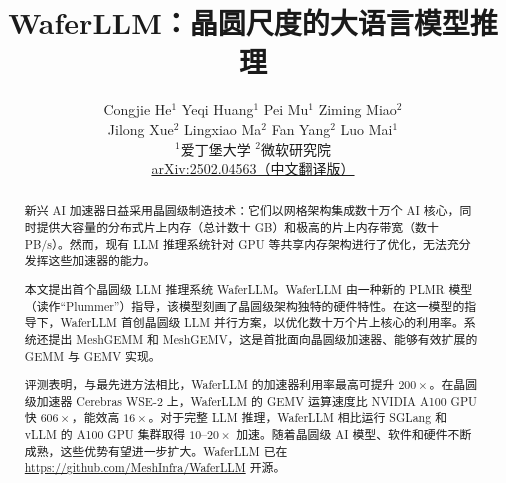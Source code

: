 \documentclass[letterpaper,twocolumn,10pt]{article}
\title{WaferLLM：晶圆尺度的大语言模型推理}
\date{}
\author{%
Congjie He$^1$ \quad Yeqi Huang$^1$ \quad Pei Mu$^1$ \quad Ziming Miao$^2$ \\
Jilong Xue$^2$ \quad Lingxiao Ma$^2$ \quad Fan Yang$^2$ \quad Luo Mai$^1$\\[-1pt]
$^1$爱丁堡大学 \quad $^2$微软研究院\\[-1pt]
\href{https://arxiv.org/abs/2502.04563}{arXiv:2502.04563（中文翻译版）}}
\newcommand{\gemm}{MeshGEMM\xspace}
\newcommand{\gemv}{MeshGEMV\xspace}
\newcommand{\sys}{WaferLLM\xspace}
\begin{document}
\maketitle
\vspace{-1.0em}

\begin{abstract}
新兴 AI 加速器日益采用晶圆级制造技术：它们以网格架构集成数十万个 AI 核心，同时提供大容量的分布式片上内存（总计数十 GB）和极高的片上内存带宽（数十 PB/s）。然而，现有 LLM 推理系统针对 GPU 等共享内存架构进行了优化，无法充分发挥这些加速器的能力。

本文提出首个晶圆级 LLM 推理系统 \sys。\sys 由一种新的 PLMR 模型（读作“Plummer”）指导，该模型刻画了晶圆级架构独特的硬件特性。在这一模型的指导下，\sys 首创晶圆级 LLM 并行方案，以优化数十万个片上核心的利用率。系统还提出 \gemm 和 \gemv，这是首批面向晶圆级加速器、能够有效扩展的 GEMM 与 GEMV 实现。

评测表明，与最先进方法相比，\sys 的加速器利用率最高可提升 $200\times$。在晶圆级加速器 Cerebras WSE-2 上，\sys 的 GEMV 运算速度比 NVIDIA A100 GPU 快 $606\times$，能效高 $16\times$。对于完整 LLM 推理，\sys 相比运行 SGLang 和 vLLM 的 A100 GPU 集群取得 $10$--$20\times$ 加速。随着晶圆级 AI 模型、软件和硬件不断成熟，这些优势有望进一步扩大。\sys 已在 \href{https://github.com/MeshInfra/WaferLLM}{https://github.com/MeshInfra/WaferLLM} 开源。
\end{abstract}










\clearpage


\end{document}
